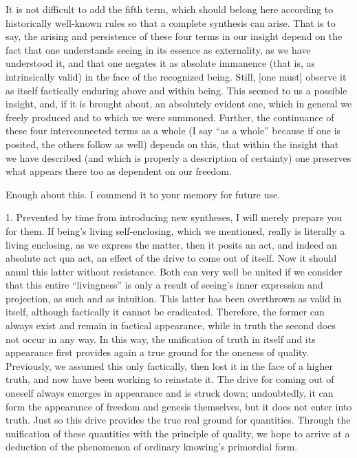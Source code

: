 It is not difficult to add the fifth term,
which should belong here
according to historically well-known rules
so that a complete synthesis can arise.
That is to say, the arising and persistence
of these four terms in our insight depend
on the fact that one understands
seeing in its essence as externality,
as we have understood it,
and that one negates it as absolute immanence
(that is, as intrinsically valid)
in the face of the recognized being.
Still, [one must] observe it as itself
factically enduring above and within being.
This seemed to us a possible insight,
and, if it is brought about,
an absolutely evident one,
which in general we freely produced
and to which we were summoned.
Further, the continuance of these
four interconnected terms as a whole
(I say “as a whole” because if one is posited,
the others follow as well)
depends on this,
that within the insight that we have described
(and which is properly a description of certainty)
one preserves what appears there too as dependent on our freedom.

Enough about this. I commend it to your memory for future use.

1. Prevented by time from introducing new syntheses,
I will merely prepare you for them.
If being’s living self-enclosing, which we mentioned,
really is literally a living enclosing,
as we express the matter,
then it posits an act, and indeed an absolute act qua act,
an effect of the drive to come out of itself.
Now it should annul this latter without resistance.
Both can very well be united if we consider that
this entire “livingness” is only a result
of seeing’s inner expression and projection,
as such and as intuition.
This latter has been overthrown as valid in itself,
although factically it cannot be eradicated.
Therefore, the former can always exist
and remain in factical appearance,
while in truth the second does not occur in any way.
In this way, the unification of truth in itself
and its appearance first provides again
a true ground for the oneness of quality.
Previously, we assumed this only factically,
then lost it in the face of a higher truth,
and now have been working to reinstate it.
The drive for coming out of oneself
always emerges in appearance
and is struck down;
undoubtedly, it can form the appearance
of freedom and genesis themselves,
but it does not enter into truth.
Just so this drive provides
the true real ground for quantities.
Through the unification of these quantities
with the principle of quality,
we hope to arrive at a deduction of
the phenomenon of ordinary knowing’s
primordial form.

